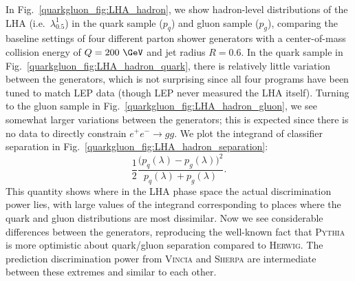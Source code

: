 \documentclass[11pt]{cernrep}
\begin{document}
In Fig.~\ref{quarkgluon_fig:LHA_hadron}, we show hadron-level distributions of the LHA (i.e.~$\lambda_{0.5}^1$) in the quark sample ($p_q$) and gluon sample ($p_g$), comparing the baseline settings of four different parton shower generators with a center-of-mass collision energy of $Q = 200~\GeV$ and jet radius $R = 0.6$. In the quark sample in Fig.~\ref{quarkgluon_fig:LHA_hadron_quark}, there is relatively little variation between the generators, which is not surprising since all four programs have been tuned to match LEP data (though LEP never measured the LHA itself).  Turning to the gluon sample in Fig.~\ref{quarkgluon_fig:LHA_hadron_gluon}, we see somewhat larger variations between the generators; this is expected since there is no data to directly constrain $e^+ e^- \to gg$.   We plot the integrand of classifier separation in Fig.~\ref{quarkgluon_fig:LHA_hadron_separation}:
\begin{equation}
\label{quarkgluon_eq:deltaintegrand}
\frac{1}{2} \frac{\bigl(p_q(\lambda) - p_g(\lambda) \bigr)^2}{p_q(\lambda) + p_g(\lambda)}.
\end{equation}
This quantity shows where in the LHA phase space the actual discrimination power lies, with large values of the integrand corresponding to places where the quark and gluon distributions are most dissimilar.  Now we see considerable differences between the generators, reproducing the well-known fact that \textsc{Pythia} is more optimistic about quark/gluon separation compared to \textsc{Herwig}.  The prediction discrimination power from \textsc{Vincia} and \textsc{Sherpa} are intermediate between these extremes and similar to each other.
\end{document}
